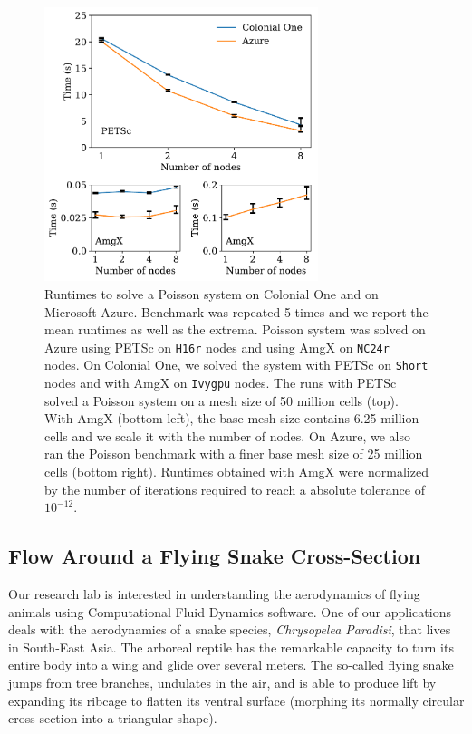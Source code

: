 \documentclass[10pt,journal,compsoc]{IEEEtran}
\begin{document}
\begin{figure}[!h]
    \centering
    \includegraphics[width=8cm]{figures/poisson_time_vs_nodes.pdf}
    \caption{Runtimes to solve a Poisson system on Colonial One and on Microsoft Azure. Benchmark was repeated 5 times and we report the mean runtimes as well as the extrema. Poisson system was solved on Azure using PETSc on \texttt{H16r} nodes and using AmgX on \texttt{NC24r} nodes. On Colonial One, we solved the system with PETSc on \texttt{Short} nodes and with AmgX on \texttt{Ivygpu} nodes. The runs with PETSc solved a Poisson system on a mesh size of 50 million cells (top). With AmgX (bottom left), the base mesh size contains 6.25 million cells and we scale it with the number of nodes. On Azure, we also ran the Poisson benchmark with a finer base mesh size of 25 million cells (bottom right). Runtimes obtained with AmgX were normalized by the number of iterations required to reach a absolute tolerance of $10^{-12}$.}
    \label{fig:poisson_benchmarks}
\end{figure}

\subsection{Flow Around a Flying Snake Cross-Section}\label{subsec:snake}

Our research lab is interested in understanding the aerodynamics of flying animals using Computational Fluid Dynamics software.
One of our applications deals with the aerodynamics of a snake species, \textit{Chrysopelea Paradisi}, that lives in South-East Asia.
The arboreal reptile has the remarkable capacity to turn its entire body into a wing and glide over several meters\cite{socha_2011}.
The so-called flying snake jumps from tree branches, undulates in the air, and is able to produce lift by expanding its ribcage to flatten its ventral surface (morphing its normally circular cross-section into a triangular shape).
\end{document}
